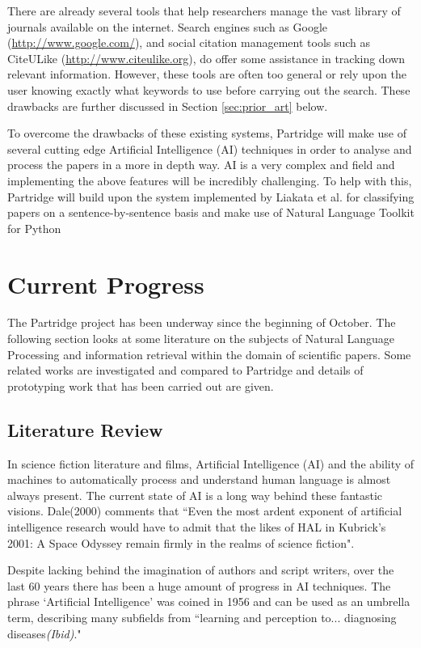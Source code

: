 \documentclass[12pt,a4paper]{article}
\begin{document}
There are already several tools that help researchers manage the vast library
of journals available on the internet. Search engines such as Google
({\url{http://www.google.com/}}), and social citation management tools such as
CiteULike ({\url{http://www.citeulike.org}}), do offer some assistance in
tracking down relevant information. However, these tools are often too general
or rely upon the user knowing exactly what keywords to use before carrying out
the search. These drawbacks are further discussed in Section
\ref{sec:prior_art} below.

To overcome the drawbacks of these existing systems, Partridge will make use of
several cutting edge Artificial Intelligence (AI) techniques in order to analyse and
process the papers in a more in depth way. AI is a very complex and field and
implementing the above features will be incredibly challenging. To help with
this, Partridge will build upon the system implemented by Liakata et al. for
classifying papers on a sentence-by-sentence basis\cite{citeulike:10444769} and
make use of Natural Language Toolkit for Python
\cite{Bird:2006:NNL:1225403.1225421} 

\section{Current Progress}

The Partridge project has been underway since the beginning of October. The
following section looks at some literature on the subjects of Natural Language
Processing and information retrieval within the domain of scientific papers.
Some related works are investigated and compared to Partridge and details of
prototyping work that has been carried out are given.

\subsection{Literature Review}

In science fiction literature and films, Artificial Intelligence (AI) and the
ability of machines to automatically process and understand human language is
almost always present. The current state of AI is a long way behind these
fantastic visions. Dale(2000) comments that ``Even the most ardent exponent of
artificial intelligence research would have to admit that the likes of HAL in
Kubrick's 2001: A Space Odyssey remain firmly in the realms of science
fiction\cite{dale2000handbook}".

Despite lacking behind the imagination of authors and script writers, over the last 60 years there
has been a huge amount of progress in AI techniques. The phrase `Artificial
Intelligence' was coined in 1956\cite{russell2010artificial} and can be used as
an umbrella term, describing many subfields from ``learning and perception
to... diagnosing diseases\emph{(Ibid)}."
\end{document}
